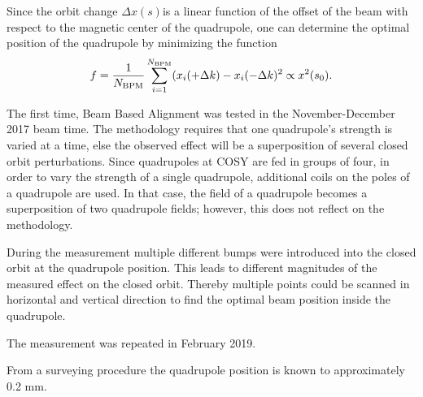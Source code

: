 Since the orbit change $\Delta x(s)$is a linear function of the offset of the beam with respect to the magnetic center of the quadrupole, one can determine the optimal position of the quadrupole by minimizing the function
\[
f = \frac{1}{N_{\mathrm{BPM}}}\sum_{i=1}^{N_{\mathrm{BPM}}} (x_i(+\Delta k) -x_i(-\Delta k)^2 \propto x^2(s_0).
\]

The first time, Beam Based Alignment was tested in the November-December 2017 beam time. The methodology requires that one quadrupole's strength is varied at a time, else the observed effect will be a superposition
of several closed orbit perturbations. Since quadrupoles at COSY are fed in groups of four, in order to vary the strength of a single quadrupole, additional coils on the poles of a quadrupole are used. In that case, 
the field of a quadrupole becomes a superposition of two quadrupole fields; however, this does not reflect on the methodology. 

During the measurement multiple different bumps were introduced into the closed orbit
at the quadrupole position. This leads to different magnitudes of the measured effect on the
closed orbit. Thereby multiple points could be scanned in horizontal and vertical direction
to find the optimal beam position inside the quadrupole.~\cite[p.~60]{Wagner:BBA2018}

The measurement was repeated in February 2019.

From a surveying procedure the quadrupole position is known to approximately 0.2 mm.~\cite[\textbf{Results and achievements at COSY}]{YellowReport}